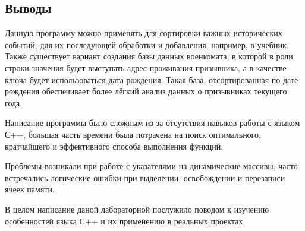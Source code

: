 \documentclass[12pt]{article}
\begin{document}
\newpage
\subsection*{Выводы}

Данную программу можно применять для сортировки важных исторических событий, для их последующей обработки и добавления, например, в учебник.\\

Также существует вариант создания базы данных военкомата, в которой в роли строки-значения будет выступать адрес проживания призывника, а в качестве ключа будет использоваться дата рождения. Такая база, отсортированная по дате рождения обеспечивает более лёгкий анализ данных о призывниках текущего года.


Написание программы было сложным из за отсутствия навыков работы с языком С++, большая часть времени была потрачена на поиск оптимального, кратчайшего и эффективного способа выполнения функций.


Проблемы возникали при работе с указателями на динамические массивы, часто встречались логические ошибки при выделении, освобождении и перезаписи ячеек памяти.


В целом написание даной лабораторной послужило поводом к изучению особенностей языка С++ и их применению в реальных проектах.


\end{document}
